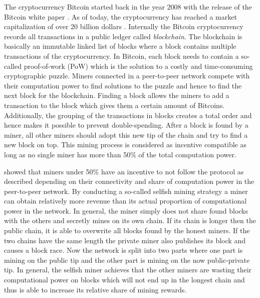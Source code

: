 The cryptocurrency Bitcoin started back in the year 2008 with the release of the Bitcoin white paper \cite{nakamoto2008bitcoin}.
As of today, the cryptocurrency has reached a market capitalization of over 20 billion dollars \cite{marketcap2017}.
Internally the Bitcoin cryptocurrency records all transactions in a public ledger called \emph{blockchain}.
The blockchain is basically an immutable linked list of blocks where a block contains multiple transactions of the cryptocurrency.
In Bitcoin, each block needs to contain a so-called proof-of-work (PoW) which is the solution to a costly and time-consuming cryptographic puzzle.
Miners connected in a peer-to-peer network compete with their computation power to find solutions to the puzzle and hence to find the next block for the blockchain.
Finding a block allows the miners to add a transaction to the block which gives them a certain amount of Bitcoins.
Additionally, the grouping of the transactions in blocks creates a total order and hence makes it possible to prevent double-spending.
After a block is found by a miner, all other miners should adopt this new tip of the chain and try to find a new block on top.
This mining process is considered as incentive compatible as long as no single miner has more than 50\% of the total computation power.

\cite{eyal2014majority} showed that miners under 50\% have an incentive to not follow the protocol as described depending on their connectivity and share of computation power in the peer-to-peer network.
By conducting a so-called selfish mining strategy a miner can obtain relatively more revenue than its actual proportion of computational power in the network.
In general, the miner simply does not share found blocks with the others and secretly mines on its own chain.
If its chain is longer then the public chain, it is able to overwrite all blocks found by the honest miners.
If the two chains have the same length the private miner also publishes its block and causes a block race.
Now the network is split into two parts where one part is mining on the public tip and the other part is mining on the now public-private tip.
In general, the selfish miner achieves that the other miners are wasting their computational power on blocks which will not end up in the longest chain and thus is able to increase its relative share of mining rewards.

